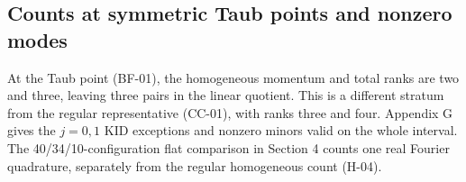 \subsection{Counts at symmetric Taub points and nonzero modes}

At the Taub point (BF-01), the homogeneous momentum and total ranks are two and three, leaving three pairs in the linear quotient. This is a different stratum from the regular representative (CC-01), with ranks three and four. Appendix G gives the $j=0,1$ KID exceptions and nonzero minors valid on the whole interval. The 40/34/10-configuration flat comparison in Section 4 counts one real Fourier quadrature, separately from the regular homogeneous count (H-04).
